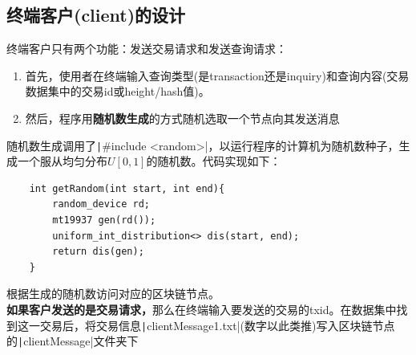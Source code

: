 \documentclass[10pt,a4paper]{article}
\begin{document}
    \subsection{终端客户(client)的设计}
    \noindent 终端客户只有两个功能：发送交易请求和发送查询请求：
    \begin{enumerate}
        \item 首先，使用者在终端输入查询类型(是transaction还是inquiry)和查询内容(交易数据集中的交易id或height/hash值)。
        \item 然后，程序用\textbf{随机数生成}的方式随机选取一个节点向其发送消息
    \end{enumerate}
    \noindent 随机数生成调用了\texttt|#include <random>|，以运行程序的计算机为随机数种子，生成一个服从均匀分布$U[0,1]$的随机数。代码实现如下：
    \begin{verbatim}
    int getRandom(int start, int end){
        random_device rd;
        mt19937 gen(rd());
        uniform_int_distribution<> dis(start, end);
        return dis(gen);
    }
    \end{verbatim}
    \noindent 根据生成的随机数访问对应的区块链节点。\\
    \textbf{如果客户发送的是交易请求，}那么在终端输入要发送的交易的txid。在数据集中找到这一交易后，将交易信息\texttt|clientMessage1.txt|(数字以此类推)写入区块链节点的\texttt|clientMessage|文件夹下
\end{document}
